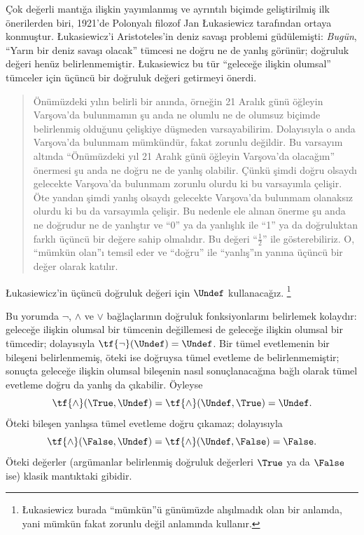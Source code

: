 \documentclass[../../../include/open-logic-section]{subfiles}
\begin{document}


Çok değerli mantığa ilişkin yayımlanmış ve ayrıntılı biçimde geliştirilmiş
ilk önerilerden biri, 1921'de Polonyalı filozof Jan \L ukasiewicz tarafından
ortaya konmuştur. \L ukasiewicz'i Aristoteles'in deniz savaşı problemi
güdülemişti: \emph{Bugün}, “Yarın bir deniz savaşı olacak” tümcesi ne doğru
ne de yanlış görünür; doğruluk değeri henüz belirlenmemiştir. \L ukasiewicz
bu tür “geleceğe ilişkin olumsal” tümceler için üçüncü bir doğruluk değeri
getirmeyi önerdi.
\begin{quote}
Önümüzdeki yılın belirli bir anında, örneğin 21 Aralık günü öğleyin
Varşova'da bulunmamın şu anda ne olumlu ne de olumsuz biçimde belirlenmiş
olduğunu çelişkiye düşmeden varsayabilirim. Dolayısıyla o anda Varşova'da
bulunmam mümkündür, fakat zorunlu değildir. Bu varsayım altında “Önümüzdeki
yıl 21 Aralık günü öğleyin Varşova'da olacağım” önermesi şu anda ne doğru ne
de yanlış olabilir. Çünkü şimdi doğru olsaydı gelecekte Varşova'da bulunmam
zorunlu olurdu ki bu varsayımla çelişir. Öte yandan şimdi yanlış olsaydı
gelecekte Varşova'da bulunmam olanaksız olurdu ki bu da varsayımla çelişir.
Bu nedenle ele alınan önerme şu anda ne doğrudur ne de yanlıştır ve “0” ya da
yanlışlık ile “1” ya da doğruluktan farklı üçüncü bir değere sahip olmalıdır.
Bu değeri “$\frac{1}{2}$” ile gösterebiliriz. O, “mümkün olan”ı temsil eder
ve “doğru” ile “yanlış”ın yanına üçüncü bir değer olarak katılır.
\end{quote}
\L ukasiewicz'in üçüncü doğruluk değeri için $\Undef$ kullanacağız.
\footnote{\L ukasiewicz burada “mümkün”ü günümüzde alışılmadık olan bir
anlamda, yani mümkün fakat zorunlu değil anlamında kullanır.}

Bu yorumda $\lnot$, $\land$ ve $\lor$ bağlaçlarının doğruluk fonksiyonlarını
belirlemek kolaydır: geleceğe ilişkin olumsal bir tümcenin değillemesi de
geleceğe ilişkin olumsal bir tümcedir; dolayısıyla
$\tf{\lnot}(\Undef) = \Undef$. Bir tümel evetlemenin bir bileşeni
belirlenmemiş, öteki ise doğruysa tümel evetleme de belirlenmemiştir; sonuçta
geleceğe ilişkin olumsal bileşenin nasıl sonuçlanacağına bağlı olarak
tümel evetleme doğru da yanlış da çıkabilir. Öyleyse
\[
    \tf{\land}(\True, \Undef) =
\tf{\land}(\Undef, \True) =
\Undef.
\]
Öteki bileşen yanlışsa tümel evetleme doğru çıkamaz; dolayısıyla
\[\tf{\land}(\False, \Undef) =
\tf{\land}(\Undef, \False) = \False.\]
Öteki değerler (argümanlar belirlenmiş doğruluk değerleri $\True$ ya da
$\False$ ise) klasik mantıktaki gibidir.
\end{document}
